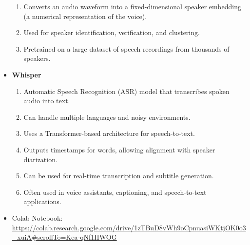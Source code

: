 \documentclass[a4paper]{article}
\begin{document}
\begin{itemize}
    \begin{enumerate}
        \item Converts an audio waveform into a fixed-dimensional speaker embedding (a numerical representation of the voice).
        \item Used for speaker identification, verification, and clustering.
        \item Pretrained on a large dataset of speech recordings from thousands of speakers. 
    \end{enumerate}
    \item \textbf{Whisper}
    \begin{enumerate}
        \item Automatic Speech Recognition (ASR) model that transcribes spoken audio into text.
        \item Can handle multiple languages and noisy environments.
        \item Uses a Transformer-based architecture for speech-to-text.
        \item Outputs timestamps for words, allowing alignment with speaker diarization.
        \item Can be used for real-time transcription and subtitle generation.
        \item Often used in voice assistants, captioning, and speech-to-text applications.
    \end{enumerate}
    \item Colab Notebook: \url{https://colab.research.google.com/drive/1zTBuD8vWh9oCpnuasiWKtjOK0o3_xuiA#scrollTo=Kea-qNf1HWOG}
\end{itemize}
\end{document}
